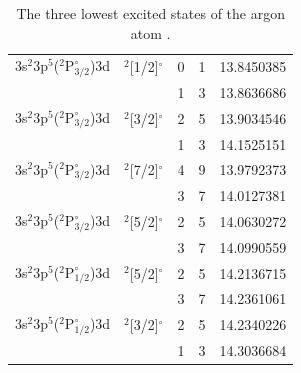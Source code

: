 \begin{table}[]
\begin{tabular}{lllll}
3s$^\text{2}$3p$^\text{5}$($^\text{2}\text{P}^{\circ}_\text{3/2}$)3d & $^\text{2}${[}1/2{]}$^{\circ}$ & 0 & 1 & 13.8450385                                             \\
                 &             & 1 & 3 & 13.8636686                                             \\
3s$^\text{2}$3p$^\text{5}$($^\text{2}\text{P}^{\circ}_\text{3/2}$)3d & $^\text{2}${[}3/2{]}$^{\circ}$ & 2 & 5 & 13.9034546                                             \\
                 &             & 1 & 3 & 14.1525151                                             \\
3s$^\text{2}$3p$^\text{5}$($^\text{2}\text{P}^{\circ}_\text{3/2}$)3d & $^\text{2}${[}7/2{]}$^{\circ}$ & 4 & 9 & 13.9792373                                             \\
                 &             & 3 & 7 & 14.0127381                                             \\
3s$^\text{2}$3p$^\text{5}$($^\text{2}\text{P}^{\circ}_\text{3/2}$)3d & $^\text{2}${[}5/2{]}$^{\circ}$ & 2 & 5 & 14.0630272                                             \\
                 &             & 3 & 7 & 14.0990559                                             \\
3s$^\text{2}$3p$^\text{5}$($^\text{2}\text{P}^{\circ}_\text{1/2}$)3d & $^\text{2}${[}5/2{]}$^{\circ}$ & 2 & 5 & 14.2136715                                             \\
                 &             & 3 & 7 & 14.2361061                                             \\
3s$^\text{2}$3p$^\text{5}$($^\text{2}\text{P}^{\circ}_\text{1/2}$)3d & $^\text{2}${[}3/2{]}$^{\circ}$ & 2 & 5 & 14.2340226                                             \\
                 &             & 1 & 3 & 14.3036684                                             \\
\hline \hline
\end{tabular}
\caption{The three lowest excited states of the argon atom \cite{kramida2020nist}.}
\label{table:argonStates}
\end{table}


